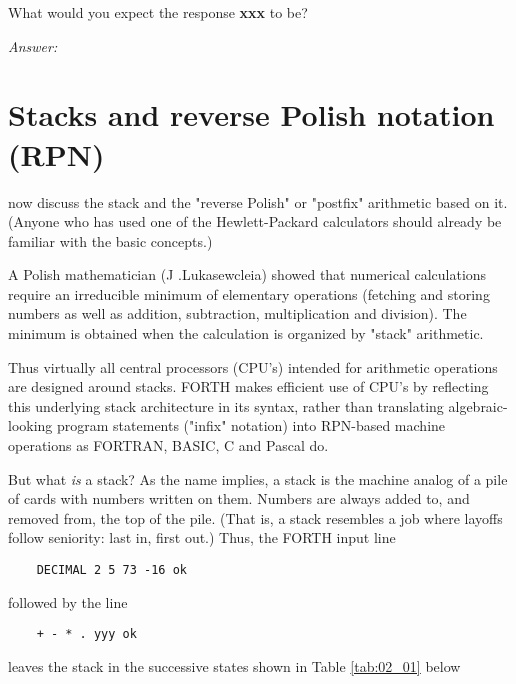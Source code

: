 What would you expect the response \textbf{xxx} to be?

\textit{Answer:} 


\section{Stacks and reverse Polish notation (RPN)}
 now discuss the stack and the "reverse Polish" or "postfix" arithmetic based on it. (Anyone who has used one of the Hewlett-Packard calculators should already be familiar with the basic concepts.)

A Polish mathematician (J .Lukasewcleia) showed that numerical calculations require an irreducible minimum of elementary operations (fetching and storing numbers as well as addition, subtraction, multiplication and division). The minimum is obtained when the calculation is organized by "stack" arithmetic.

Thus virtually all central processors (CPU's) intended for arithmetic operations are designed around stacks. FORTH makes efficient use of CPU's by reflecting this underlying stack architecture in its syntax, rather than translating algebraic-looking program statements ("infix" notation) into RPN-based machine operations as FORTRAN, BASIC, C and Pascal do.

But what \textit{is} a stack? As the name implies, a stack is the machine analog of a pile of cards with numbers written on them. Numbers are always added to, and removed from, the top of the pile. (That is, a stack resembles a job where layoffs follow seniority: last in, first out.) Thus, the FORTH input line

\begin{lstlisting}
    DECIMAL 2 5 73 -16 ok
\end{lstlisting}

followed by the line

\begin{lstlisting}
    + - * . yyy ok
\end{lstlisting}
leaves the stack in the successive states shown in Table \ref{tab:02_01} below

